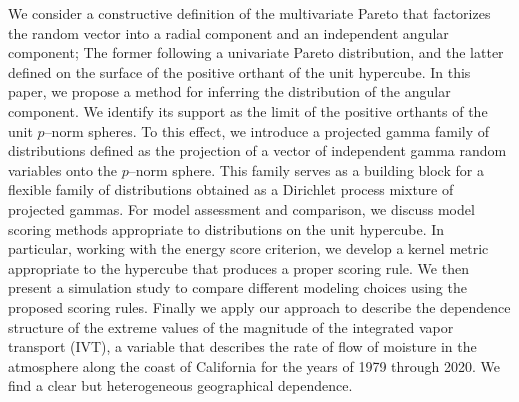 
We consider a constructive definition of the multivariate Pareto that factorizes the 
random vector into a radial component and an independent angular component; The former
following a univariate Pareto distribution, and the latter defined on the surface of the 
positive orthant of the unit hypercube.  In this paper, we  propose a method for
inferring the distribution of the angular component.  We identify its support 
as the limit of the positive orthants of the unit $p$--norm spheres.
To this effect, we introduce a projected gamma family of
distributions defined as the projection of a vector of independent gamma random variables
onto the $p$--norm sphere.  This family serves as a building block for a flexible family
of distributions obtained as a Dirichlet process mixture of projected gammas.  For 
model assessment and comparison, we discuss model scoring methods appropriate 
to distributions on the unit hypercube.  In particular, working with the energy score
criterion, we develop a kernel metric appropriate to the hypercube that produces a 
proper scoring rule.  We then present a simulation study to compare 
different modeling choices using the proposed scoring rules.  Finally we apply our 
approach to describe the dependence structure of the extreme values of the magnitude 
of the integrated vapor  transport (IVT), a variable that describes the rate of flow 
of moisture in the atmosphere  along the coast of California for the years of 1979 
through 2020.  We find a clear but heterogeneous geographical dependence.


